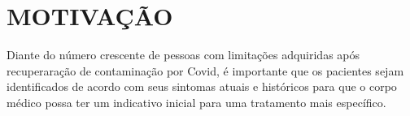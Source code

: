 \chapter{MOTIVAÇÃO}

Diante do número crescente de pessoas com limitações adquiridas após
recuperaração de contaminação por Covid, é importante que os pacientes sejam identificados de acordo com seus sintomas atuais e históricos para que o corpo médico possa ter um indicativo inicial para uma tratamento mais específico.